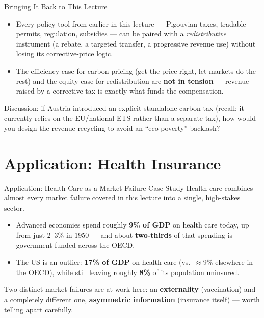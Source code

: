 \documentclass[11pt,aspectratio=169]{beamer}
\begin{document}
\begin{frame}{Bringing It Back to This Lecture}
  \small
  \begin{itemize}
    \item Every policy tool from earlier in this lecture --- Pigouvian taxes, tradable permits, regulation, subsidies --- can be paired with a \emph{redistributive} instrument (a rebate, a targeted transfer, a progressive revenue use) without losing its corrective-price logic.
    \item The efficiency case for carbon pricing (get the price right, let markets do the rest) and the equity case for redistribution are \textbf{not in tension} --- revenue raised by a corrective tax is exactly what funds the compensation.
  \end{itemize}
  \vspace{0.3em}
  \alert{Discussion:} if Austria introduced an explicit standalone carbon tax (recall: it currently relies on the EU/national ETS rather than a separate tax), how would you design the revenue recycling to avoid an ``eco-poverty'' backlash?
\end{frame}

\section{Application: Health Insurance}

\begin{frame}{Application: Health Care as a Market-Failure Case Study}
  Health care combines almost every market failure covered in this lecture into a single, high-stakes sector.
  \begin{itemize}
    \item Advanced economies spend roughly \textbf{9\% of GDP} on health care today, up from just 2--3\% in 1950 --- and about \textbf{two-thirds} of that spending is government-funded across the OECD.
    \item The US is an outlier: \textbf{17\% of GDP} on health care (vs.\ $\approx$9\% elsewhere in the OECD), while still leaving roughly \textbf{8\%} of its population uninsured.
  \end{itemize}
  \vspace{0.4em}
  \small Two distinct market failures are at work here: an \textbf{externality} (vaccination) and a completely different one, \textbf{asymmetric information} (insurance itself) --- worth telling apart carefully.
\end{frame}
\end{document}
